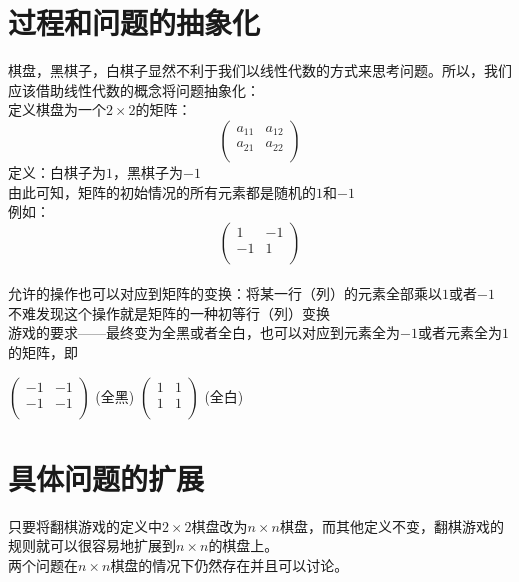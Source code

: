 \documentclass[UTF-8,a4paper]{ctexart}
\begin{document}
\section{过程和问题的抽象化}
\songti
棋盘，黑棋子，白棋子显然不利于我们以线性代数的方式来思考问题。所以，我们应该借助线性代数的概念将问题抽象化： 
\kaishu
\\定义棋盘为一个\(2 \times 2\)的矩阵：
\[\begin{pmatrix}
    a_{11}&a_{12}\\
    a_{21}&a_{22}\\
\end{pmatrix}\]
\quad
定义：白棋子为\(1\)，黑棋子为\(-1\)
\\由此可知，矩阵的初始情况的所有元素都是随机的\(1\)和\(-1\)
\\例如：
\[\begin{pmatrix}
    1&-1\\
    -1&1\\
\end{pmatrix}\]
\quad
\\允许的操作也可以对应到矩阵的变换：将某一行（列）的元素全部乘以\(1\)或者\(-1\)
\\不难发现这个操作就是矩阵的一种初等行（列）变换
\\游戏的要求——最终变为全黑或者全白，也可以对应到元素全为\(-1\)或者元素全为\(1\)的矩阵，即\\
\begin{center}
\(\begin{pmatrix}
    -1&-1\\
    -1&-1\\
\end{pmatrix}\)
\quad
(全黑)
\(\begin{pmatrix}
    1&1\\
    1&1\\
\end{pmatrix}\)
\quad
(全白)
\end{center}


\section{具体问题的扩展}
只要将翻棋游戏的定义中\(2 \times 2\)棋盘改为\(n \times n\)棋盘，而其他定义不变，翻棋游戏的规则就可以很容易地扩展到\(n \times n\)的棋盘上。 \\
两个问题在\(n \times n\)棋盘的情况下仍然存在并且可以讨论。
\end{document}
